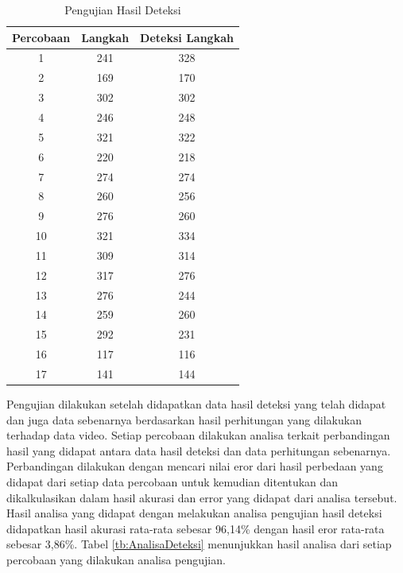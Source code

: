 \begin{longtable}{|c|c|c|}
  \caption{Pengujian Hasil Deteksi}
  \label{tb:PengujianDeteksi}                                   \\
  \hline
  \rowcolor[HTML]{C0C0C0}
  \textbf{Percobaan} & \textbf{Langkah} & \textbf{Deteksi Langkah} \\
  \hline
  1   & 241   & 328    \\
  \hline
  2   & 169   & 170    \\
  \hline
  3   & 302   & 302    \\
  \hline
  4   & 246   & 248    \\
  \hline
  5   & 321   & 322    \\
  \hline
  6   & 220   & 218    \\
  \hline
  7   & 274   & 274    \\
  \hline
  8   & 260   & 256    \\
  \hline
  9   & 276   & 260    \\
  \hline
  10   & 321   & 334    \\
  \hline
  11   & 309   & 314    \\
  \hline
  12   & 317   & 276    \\
  \hline
  13   & 276   & 244    \\
  \hline
  14   & 259   & 260    \\
  \hline
  15   & 292   & 231    \\
  \hline
  16   & 117   & 116    \\
  \hline
  17   & 141   & 144    \\
  \hline
\end{longtable}
\clearpage

Pengujian dilakukan setelah didapatkan data hasil deteksi yang telah didapat dan juga data sebenarnya berdasarkan hasil perhitungan yang dilakukan terhadap data video. Setiap percobaan dilakukan analisa terkait perbandingan hasil yang didapat antara data hasil deteksi dan data perhitungan sebenarnya. Perbandingan dilakukan dengan mencari nilai eror dari hasil perbedaan yang didapat dari setiap data percobaan untuk kemudian ditentukan dan dikalkulasikan dalam hasil akurasi dan error yang didapat dari analisa tersebut. Hasil analisa yang didapat dengan melakukan analisa pengujian hasil deteksi didapatkan hasil akurasi rata-rata sebesar 96,14\% dengan hasil eror rata-rata sebesar 3,86\%. Tabel \ref{tb:AnalisaDeteksi} menunjukkan hasil analisa dari setiap percobaan yang dilakukan analisa pengujian.

